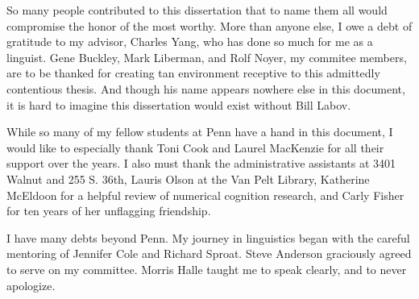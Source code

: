 So many people contributed to this dissertation that to name them all would compromise the honor of the most worthy. More than anyone else, I owe a debt of gratitude to my advisor, Charles Yang, who has done so much for me as a linguist. Gene Buckley, Mark Liberman, and Rolf Noyer, my commitee members, are to be thanked for creating tan environment receptive to this admittedly contentious thesis. And though his name appears nowhere else in this document, it is hard to imagine this dissertation would exist without Bill Labov.

While so many of my fellow students at Penn have a hand in this document, I would like to especially thank Toni Cook and Laurel MacKenzie for all their support over the years. 
I also must thank the administrative assistants at 3401 Walnut and 255 S. 36th, Lauris Olson at the Van Pelt Library, Katherine McEldoon for a helpful review of numerical cognition research, and Carly Fisher for ten years of her unflagging friendship.

I have many debts beyond Penn. My journey in linguistics began with the careful mentoring of Jennifer Cole and Richard Sproat. Steve Anderson graciously agreed to serve on my committee. Morris Halle taught me to speak clearly, and to never apologize.
